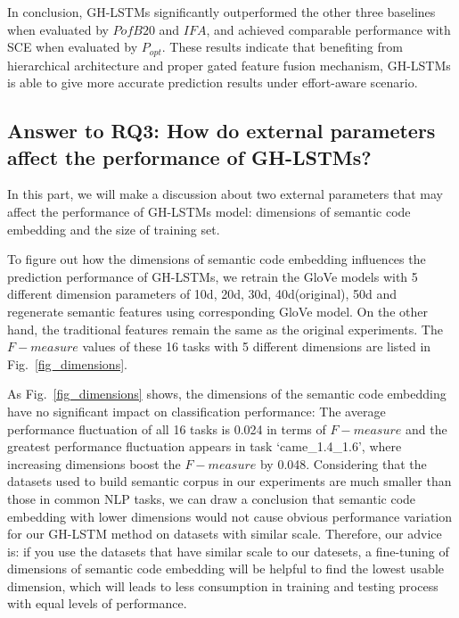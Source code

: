\documentclass[journal]{IEEEtran}
\begin{document}
In conclusion, GH-LSTMs significantly outperformed the other three baselines when evaluated by $PofB20$ and $IFA$, and achieved comparable performance with SCE when evaluated by $P_{opt}$. These results indicate that benefiting from hierarchical architecture and proper gated feature fusion mechanism, GH-LSTMs is able to give more accurate prediction results under effort-aware scenario.

\subsection{Answer to RQ3: How do external parameters affect the performance of GH-LSTMs?}
In this part, we will make a discussion about two external parameters that may affect the performance of GH-LSTMs model: dimensions of semantic code embedding and the size of training set.

To figure out how the dimensions of semantic code embedding influences the prediction performance of GH-LSTMs, we retrain the GloVe models with 5 different dimension parameters of 10d, 20d, 30d, 40d(original), 50d and regenerate semantic features using corresponding GloVe model. On the other hand, the traditional features remain the same as the original experiments. The $F-measure$ values of these 16 tasks with 5 different dimensions are listed in Fig.~\ref{fig_dimensions}.

As Fig.~\ref{fig_dimensions} shows, the dimensions of the semantic code embedding have no significant impact on classification performance: The average performance fluctuation of all 16 tasks is 0.024 in terms of $F-measure$ and the greatest performance fluctuation appears in task `came\_1.4\_1.6', where increasing dimensions boost the $F-measure$ by 0.048. Considering that the datasets used to build semantic corpus in our experiments are much smaller than those in common NLP tasks, we can draw a conclusion that semantic code embedding with lower dimensions would not cause obvious performance variation for our GH-LSTM method on datasets with similar scale. Therefore, our advice is: if you use the datasets that have similar scale to our datesets, a fine-tuning of dimensions of semantic code embedding will be helpful to find the lowest usable dimension, which will leads to less consumption in training and testing process with equal levels of performance.
\end{document}
